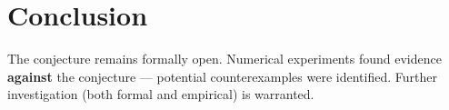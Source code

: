 \documentclass[11pt]{article}
\begin{document}
\section{Conclusion}

The conjecture remains formally open. Numerical experiments found evidence \textbf{against} the conjecture --- potential counterexamples were identified.
Further investigation (both formal and empirical) is warranted.
\end{document}
